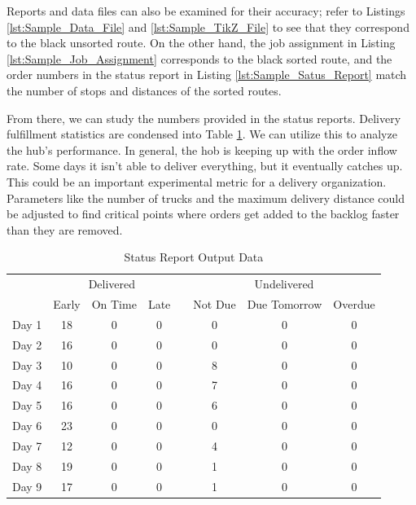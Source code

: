 \documentclass[letterpaper]{article}
\begin{document}
    Reports and data files can also be examined for their accuracy; refer to Listings \ref{lst:Sample_Data_File} and \ref{lst:Sample_TikZ_File} to see that they correspond to the black unsorted route. On the other hand, the job assignment in Listing \ref{lst:Sample_Job_Assignment} corresponds to the black sorted route, and the order numbers in the status report in Listing \ref{lst:Sample_Satus_Report} match the number of stops and distances of the sorted routes.

    From there, we can study the numbers provided in the status reports. Delivery fulfillment statistics are condensed into Table \ref{table:deliverystats}. We can utilize this to analyze the hub's performance. In general, the hob is keeping up with the order inflow rate. Some days it isn't able to deliver everything, but it eventually catches up. This could be an important experimental metric for a delivery organization. Parameters like the number of trucks and the maximum delivery distance could be adjusted to find critical points where orders get added to the backlog faster than they are removed.

    \begin{table}[h]
        \centering
        \caption{Status Report Output Data}
        \label{table:deliverystats}
        \begin{tabular}{cccccccc}
            & \multicolumn{3}{c}{Delivered} && \multicolumn{3}{c}{Undelivered} \\
            & Early & On Time & Late && Not Due & Due Tomorrow & Overdue \\
            \cline{2-4} \cline{6-8}
            Day 1 & 18 & 0 & 0 && 0 & 0 & 0 \\
            Day 2 & 16 & 0 & 0 && 0 & 0 & 0 \\
            Day 3 & 10 & 0 & 0 && 8 & 0 & 0 \\
            Day 4 & 16 & 0 & 0 && 7 & 0 & 0 \\
            Day 5 & 16 & 0 & 0 && 6 & 0 & 0 \\
            Day 6 & 23 & 0 & 0 && 0 & 0 & 0 \\
            Day 7 & 12 & 0 & 0 && 4 & 0 & 0 \\
            Day 8 & 19 & 0 & 0 && 1 & 0 & 0 \\
            Day 9 & 17 & 0 & 0 && 1 & 0 & 0 \\
        \end{tabular}
    \end{table}
\end{document}
